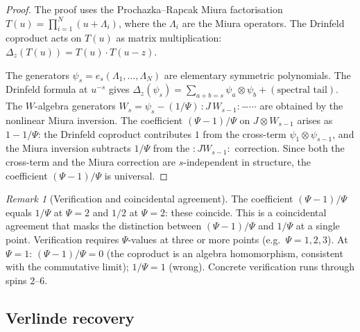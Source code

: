 \documentclass[11pt,reqno]{amsart}
\theoremstyle{definition}
\theoremstyle{remark}
\newtheorem{remark}[theorem]{Remark}
\begin{document}
\begin{proof}
The proof uses the Prochazka--Rapcak Miura factorisation
$T(u) = \prod_{i=1}^{N} (u + \Lambda_i)$, where the
$\Lambda_i$ are the Miura operators. The Drinfeld coproduct
acts on $T(u)$ as matrix multiplication:
$\Delta_z(T(u)) = T(u) \cdot T(u-z)$.

The generators $\psi_s = e_s(\Lambda_1,\ldots,\Lambda_N)$
are elementary symmetric polynomials. The Drinfeld formula
at $u^{-s}$ gives
$\Delta_z(\psi_s) = \sum_{a+b=s}
\psi_a \otimes \psi_b + (\text{spectral tail})$.
The $W$-algebra generators
$W_s = \psi_s - (1/\Psi)\,{:}J\,W_{s-1}{:} - \cdots$ are
obtained by the nonlinear Miura inversion. The coefficient
$(\Psi-1)/\Psi$ on $J \otimes W_{s-1}$ arises as
$1 - 1/\Psi$: the Drinfeld
coproduct contributes $1$ from the cross-term
$\psi_1 \otimes \psi_{s-1}$, and the Miura inversion
subtracts $1/\Psi$ from the ${:}JW_{s-1}{:}$ correction.
Since both the cross-term and the Miura correction are
$s$-independent in structure, the coefficient $(\Psi-1)/\Psi$
is universal.
\end{proof}

\begin{remark}[Verification and coincidental agreement]
\label{rem:e-miura-verification}
The coefficient $(\Psi-1)/\Psi$ equals $1/\Psi$ at $\Psi = 2$
and $1/2$ at $\Psi = 2$: these coincide. This is a
coincidental agreement that masks the distinction between
$(\Psi-1)/\Psi$ and $1/\Psi$ at a single point. Verification
requires $\Psi$-values at three or more points (e.g.\
$\Psi = 1, 2, 3$). At $\Psi = 1$: $(\Psi-1)/\Psi = 0$
(the coproduct is an algebra homomorphism, consistent with the
commutative limit); $1/\Psi = 1$ (wrong). Concrete
verification runs through spins $2$--$6$.
\end{remark}

\subsection{Verlinde recovery}
\end{document}
